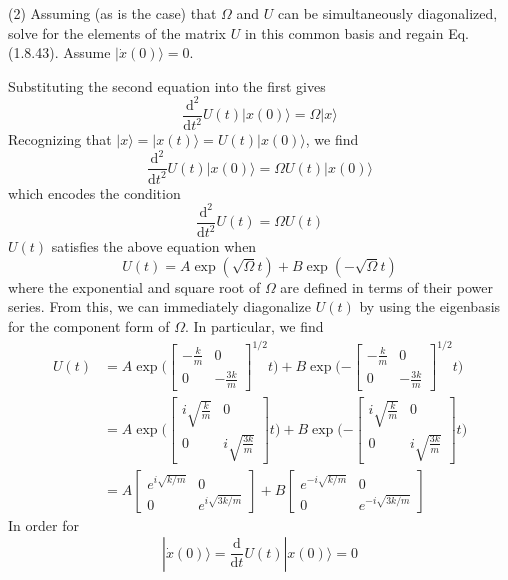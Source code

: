 \documentclass[../principles-of-quantum-mechanics.tex]{subfiles}
\begin{document}
\begin{questions}
(2) Assuming (as is the case) that $\Omega$ and $U$ can be simultaneously diagonalized, solve for the elements of the matrix $U$ in this common basis and regain Eq. (1.8.43). Assume $|\dot{x}(0)\rangle = 0$.

\begin{solution}
	Substituting the second equation into the first gives
	\[
		\frac{\mathrm{d}^2}{\mathrm{d}t^2}U(t)|x(0)\rangle = \Omega|x\rangle
	\]
	Recognizing that $|x\rangle = |x(t)\rangle = U(t)|x(0)\rangle$, we find
	\[
		\frac{\mathrm{d}^2}{\mathrm{d}t^2}U(t)|x(0)\rangle = \Omega{U(t)}|x(0)\rangle
	\]
	which encodes the condition
	\[
		\frac{\mathrm{d}^2}{\mathrm{d}t^2}U(t) = \Omega{U(t)}
	\]
	$U(t)$ satisfies the above equation when
	\[
		U(t) = A\exp(\sqrt{\Omega}{t}) + B\exp(-\sqrt{\Omega}{t})
	\]
	where the exponential and square root of $\Omega$ are defined in terms of their power series. From this, we can immediately diagonalize $U(t)$ by using the eigenbasis for the component form of $\Omega$. In particular, we find
	\begin{align*}
		U(t) &= A\exp\Big(\begin{bmatrix}
			{-\frac{k}{m}} & 0 \\ 0 & {-\frac{3k}{m}}
		\end{bmatrix}^{1/2}t\Big) + B\exp\Big({-\begin{bmatrix}
		{-\frac{k}{m}} & 0 \\ 0 & {-\frac{3k}{m}}
		\end{bmatrix}}^{1/2}t\Big) \\
		&= A\exp\Big(\begin{bmatrix}
			i\sqrt{\frac{k}{m}} & 0 \\
			0 & i\sqrt{\frac{3k}{m}}
		\end{bmatrix}t\Big) + B\exp\Big({-\begin{bmatrix}
		i\sqrt{\frac{k}{m}} & 0 \\
		0 & i\sqrt{\frac{3k}{m}}
		\end{bmatrix}}t\Big) \\
	&= A\begin{bmatrix}
		e^{i\sqrt{k/m}} & 0 \\ 0 & e^{i\sqrt{3k/m}}
	\end{bmatrix} + B\begin{bmatrix}
	e^{-i\sqrt{k/m}} & 0 \\ 0 & e^{-i\sqrt{3k/m}}
	\end{bmatrix}
	\end{align*}
	In order for 
	\[
		|\dot{x}(0)\rangle=\frac{\mathrm{d}}{\mathrm{d}t}U(t)|x(0)\rangle=0
\]
\end{solution}
\end{questions}
\end{document}
